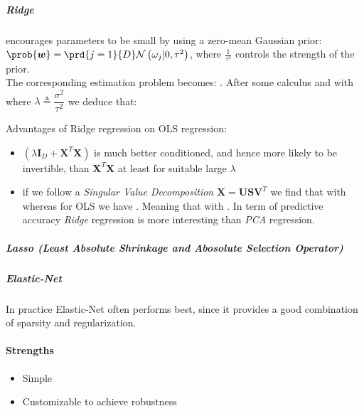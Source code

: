 \subparagraph{Ridge}
encourages parameters to be small by using a zero-mean Gaussian prior: $\prob{\bm{w}} = 
\prd{j=1}{D} \mathcal{N}\left(\omega_{j}|0, \tau^{2}\right)$, where $\frac{1}{\tau^{2}}$
controls the strength of the prior.\\
The corresponding  estimation problem becomes:
. After some calculus and with where $\lambda \triangleq 
\dfrac{\sigma^{2}}{\tau^{2}}$ we deduce that:
\begin{center}
\end{center}
Advantages of Ridge regression on OLS regression:
\begin{itemize}
    \item $\left(\lambda\bm{I}_{D}+\bm{X}^{T}\bm{X}\right)$ is much better conditioned, 
        and hence more likely to be invertible, than $\bm{X}^{T}\bm{X}$ at least for 
        suitable large $\lambda$
    \item if we follow a \emph{Singular Value Decomposition} $\bm{X} = \bm{U}\bm{S}
        \bm{V}^{T}$ we find 
        that 
        with 
        whereas for OLS we have . Meaning that with . In term of predictive accuracy
        \emph{Ridge} regression is more interesting than \emph{PCA} regression.
\end{itemize}
\subparagraph{Lasso (Least Absolute Shrinkage and Abosolute Selection Operator)}

\subparagraph{Elastic-Net}
In practice Elastic-Net often performs best, since it provides a good combination of
sparsity and regularization.
\paragraph{Strengths}
\begin{itemize}
    \item Simple
    \item Customizable to achieve robustness
\end{itemize}

